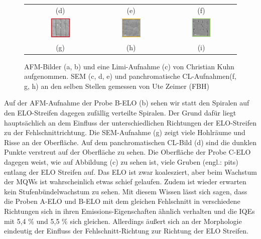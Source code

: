 \begin{figure}[H]
\begin{tabular}{ccc}
(d)  & (e) & (f)   \\[6pt]
\includegraphics[width=0.30\textwidth]{Bilder/TS4045/aELOcl1.png} & \includegraphics[width=0.30\textwidth]{Bilder/TS4045/bELOcl1.png}  & \includegraphics[width=0.30\textwidth]{Bilder/TS4045/cELOcl1.png} \\
(g)  & (h) & (i)   \\[6pt]
\end{tabular}
\caption{AFM-Bilder (a, b) und eine Limi-Aufnahme (c) von Christian Kuhn aufgenommen. SEM (c, d, e) und panchromatische CL-Aufnahmen(f, g, h) an den selben Stellen gemessen von Ute Zeimer (FBH)}
\label{fig:morph1}
\end{figure}
\noindent 
Auf der AFM-Aufnahme der Probe B-ELO (b) sehen wir statt den Spiralen auf den ELO-Streifen dagegen zufällig verteilte Spiralen. Der Grund dafür liegt hauptsächlich an dem Einfluss der unterschiedlichen Richtungen der ELO-Streifen zu der Fehlschnittrichtung. Die SEM-Aufnahme (g) zeigt viele Hohlräume und Risse an der Oberfläche. Auf dem panchromatischen CL-Bild (d) sind die dunklen Punkte verstreut auf der Oberfläche zu sehen. 
\newline
Die Oberfläche der Probe C-ELO dagegen weist, wie auf Abbildung (c) zu sehen ist, viele Gruben (engl.: pits) entlang der ELO Streifen auf. Das ELO ist zwar koalesziert, aber beim Wachstum der MQWs ist wahrscheinlich etwas schief gelaufen. Zudem ist wieder erwarten kein Stufenbündelwachstum zu sehen. Mit diesem Wissen lässt sich sagen, dass die Proben A-ELO und B-ELO mit dem gleichen Fehlschnitt in verschiedene Richtungen sich in ihren Emissions-Eigenschaften ähnlich verhalten und die IQEs mit 5,4 \% und 5,5 \% sich gleichen. Allerdings äußert sich an der Morphologie eindeutig der Einfluss der Fehlschnitt-Richtung zur Richtung der ELO Streifen.
